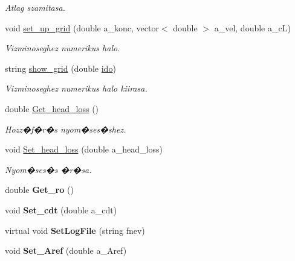 \begin{DoxyCompactItemize}
\begin{DoxyCompactList}\small\item\em Atlag szamitasa. \end{DoxyCompactList}\item 
\hypertarget{class_agelem_a144892d0f79ad876bcdb3fe70e282edf}{}\label{class_agelem_a144892d0f79ad876bcdb3fe70e282edf} 
void \hyperlink{class_agelem_a144892d0f79ad876bcdb3fe70e282edf}{set\+\_\+up\+\_\+grid} (double a\+\_\+konc, vector$<$ double $>$ a\+\_\+vel, double a\+\_\+cL)
\begin{DoxyCompactList}\small\item\em Vizminoseghez numerikus halo. \end{DoxyCompactList}\item 
\hypertarget{class_agelem_a1500c8131aaa82f6150193a8cf13050b}{}\label{class_agelem_a1500c8131aaa82f6150193a8cf13050b} 
string \hyperlink{class_agelem_a1500c8131aaa82f6150193a8cf13050b}{show\+\_\+grid} (double \hyperlink{class_agelem_a0cdf382c62ac004b8a120319be0cea84}{ido})
\begin{DoxyCompactList}\small\item\em Vizminoseghez numerikus halo kiirasa. \end{DoxyCompactList}\item 
\hypertarget{class_agelem_a9c448326eb07e271b4e2dc8a9dd2a0d9}{}\label{class_agelem_a9c448326eb07e271b4e2dc8a9dd2a0d9} 
double \hyperlink{class_agelem_a9c448326eb07e271b4e2dc8a9dd2a0d9}{Get\+\_\+head\+\_\+loss} ()
\begin{DoxyCompactList}\small\item\em Hozz�f�r�s nyom�ses�shez. \end{DoxyCompactList}\item 
\hypertarget{class_agelem_a3ff5a59abe058d7b4b6812962e291fc1}{}\label{class_agelem_a3ff5a59abe058d7b4b6812962e291fc1} 
void \hyperlink{class_agelem_a3ff5a59abe058d7b4b6812962e291fc1}{Set\+\_\+head\+\_\+loss} (double a\+\_\+head\+\_\+loss)
\begin{DoxyCompactList}\small\item\em Nyom�ses�s �r�sa. \end{DoxyCompactList}\item 
\hypertarget{class_agelem_a9d3b5645c32c2d07b163e1270138a2b2}{}\label{class_agelem_a9d3b5645c32c2d07b163e1270138a2b2} 
double {\bfseries Get\+\_\+ro} ()
\item 
\hypertarget{class_agelem_a045cfd41234f268b8f923a452df080c5}{}\label{class_agelem_a045cfd41234f268b8f923a452df080c5} 
void {\bfseries Set\+\_\+cdt} (double a\+\_\+cdt)
\item 
\hypertarget{class_agelem_a4d4a42d36256dd6c55a548934269f33c}{}\label{class_agelem_a4d4a42d36256dd6c55a548934269f33c} 
virtual void {\bfseries Set\+Log\+File} (string fnev)
\item 
\hypertarget{class_agelem_ab0d58b657fe3300b4e10b70898cf5119}{}\label{class_agelem_ab0d58b657fe3300b4e10b70898cf5119} 
void {\bfseries Set\+\_\+\+Aref} (double a\+\_\+\+Aref)
\end{DoxyCompactItemize}
